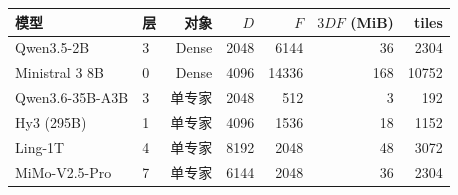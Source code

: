 \begin{tabular}{@{}llrrrrr@{}}\toprule
模型 & 层 & 对象 & $D$ & $F$ & $3DF$ (MiB) & tiles\\\midrule
Qwen3.5-2B & 3 & Dense & 2048 & 6144 & 36 & 2304\\
Ministral 3 8B & 0 & Dense & 4096 & 14336 & 168 & 10752\\
Qwen3.6-35B-A3B & 3 & 单专家 & 2048 & 512 & 3 & 192\\
Hy3 (295B) & 1 & 单专家 & 4096 & 1536 & 18 & 1152\\
Ling-1T & 4 & 单专家 & 8192 & 2048 & 48 & 3072\\
MiMo-V2.5-Pro & 7 & 单专家 & 6144 & 2048 & 36 & 2304\\
\bottomrule\end{tabular}
